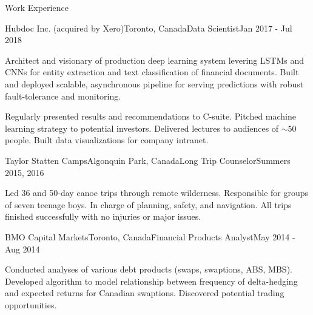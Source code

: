 \documentclass{resume} %
\begin{document}
\begin{rSection}{Work Experience}
\begin{rSubsection}{Hubdoc Inc. (acquired by Xero)}{Toronto, Canada}{Data Scientist}{Jan 2017 - Jul 2018}
\item
    Architect and visionary of production deep learning system levering LSTMs and CNNs for entity extraction and text classification of financial documents.
    Built and deployed scalable, asynchronous pipeline for serving predictions with robust fault-tolerance and monitoring.

\item
    Regularly presented results and recommendations to C-suite.
    Pitched machine learning strategy to potential investors.
    Delivered lectures to audiences of $\sim 50$ people.
    Built data visualizations for company intranet.
    
\end{rSubsection}


\begin{rSubsection}{Taylor Statten Camps}{Algonquin Park, Canada}{Long Trip Counselor}{Summers 2015, 2016}

\item
    Led 36 and 50-day canoe trips through remote wilderness. Responsible for groups of seven teenage boys. In charge of planning, 
    safety, and navigation. All trips finished successfully with no injuries or major issues.

\end{rSubsection}


\begin{rSubsection}{BMO Capital Markets}{Toronto, Canada}{Financial Products Analyst}{May 2014 - Aug 2014}

\item
    Conducted analyses of various debt products (swaps, swaptions, ABS, MBS).
    Developed algorithm to model relationship between frequency of delta-hedging and expected returns for Canadian swaptions.
    Discovered potential trading opportunities.

\end{rSubsection}


\end{rSection}

\end{document}
